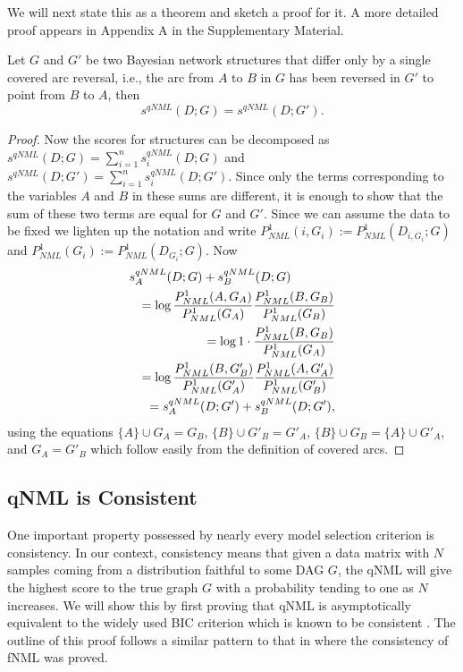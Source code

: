 We will next state this as a
theorem and sketch a proof for it. A more detailed proof appears in Appendix A in the Supplementary Material.
\begin{theorem}
  \label{thm:scoreqv}
  Let $G$ and $G'$ be two Bayesian network structures that differ only
  by a single covered arc reversal, i.e., the arc from $A$ to $B$ in $G$
  has been reversed in $G'$ to point from $B$ to $A$, then
  $$s^{qNML}(D;G)=s^{qNML}(D;G').$$
\end{theorem}
\begin{proof}
  Now the scores for structures can be decomposed as
  $s^{qNML}(D;G)=\sum_{i=1}^{n}s_i^{qNML}(D;G)$ and
  $s^{qNML}(D;G')=\sum_{i=1}^{n}s_i^{qNML}(D;G')$.  Since only the
  terms corresponding to the variables $A$ and $B$ in these sums are
  different, it is enough to show that the sum of these two terms are
  equal for $G$ and $G'$. Since we can assume the data to be fixed we
  lighten up the notation and write
  $P^1_{NML}(i,G_i) := P^1_{NML}(D_{i,G_i};G)$ and
  $P^1_{NML}(G_i)   := P^1_{NML}(D_{G_i};G)$. Now
  \begin{eqnarray}
    \lefteqn{s_A^{qNML}(D;G)+s_B^{qNML}(D;G)} \nonumber\\
    && =\log\frac{P^1_{NML}(A,G_{A})}{P^1_{NML}(G_{A})}
            \frac{P^1_{NML}(B,G_{B})}{P^1_{NML}(G_{B})}\nonumber\\
    && =\log 1\cdot\frac{P^1_{NML}(B,G_{B})}{P^1_{NML}(G_{A})}\nonumber\\
    && =\log \frac{P^1_{NML}(B,G'_{B})}{P^1_{NML}(G'_{A})}
             \frac{P^1_{NML}(A,G'_{A})}{P^1_{NML}(G'_{B})}\nonumber\\
 && =s_A^{qNML}(D;G')+s_B^{qNML}(D;G'),\nonumber
\end{eqnarray}
  using the equations $\{A\}\cup G_A = G_B$, $\{B\}\cup G'_B = G'_A$,
  $\{B\}\cup G_B = \{A\} \cup G'_A$, and $G_A = G'_B$ which follow
  easily from the definition of covered arcs.
\end{proof}

\subsection{qNML is Consistent}

One important property possessed by nearly every model selection
criterion is consistency. In our context, consistency means that given
a data matrix with $N$ samples coming from a distribution faithful to
some DAG $G$, the qNML will give the highest score to the true graph $G$
with a probability tending to one as $N$ increases. We will show this
by first proving that qNML is asymptotically equivalent to the widely used
BIC criterion which is known to be consistent \cite{Schw78, Haug88}.
The outline of this proof follows a similar pattern to that in
\cite{SilanderIJAR10} where the consistency of fNML was proved.


